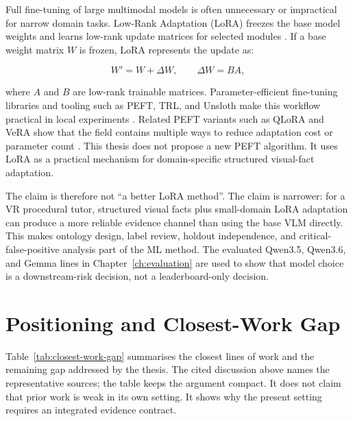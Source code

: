 Full fine-tuning of large multimodal models is often unnecessary or
impractical for narrow domain tasks. Low-Rank Adaptation (LoRA) freezes the
base model weights and learns low-rank update matrices for selected modules
\citep{hu2021lora}. If a base weight matrix \(W\) is frozen, LoRA represents
the update as:

\[
  W' = W + \Delta W,\qquad \Delta W = BA,
\]

where \(A\) and \(B\) are low-rank trainable matrices. Parameter-efficient
fine-tuning libraries and tooling such as PEFT, TRL, and Unsloth make this
workflow practical in local experiments
\citep{mangrulkar2022peft,vonwerra2020trl,unsloth2024}. Related PEFT variants
such as QLoRA and VeRA show that the field contains multiple ways to reduce
adaptation cost or parameter count \citep{dettmers2023qlora,kopiczko2023vera}.
This thesis does not propose a new PEFT algorithm. It uses LoRA as a practical
mechanism for domain-specific structured visual-fact adaptation.

The claim is therefore not ``a better LoRA method''. The claim is narrower:
for a VR procedural tutor, structured visual facts plus small-domain LoRA
adaptation can produce a more reliable evidence channel than using the base
VLM directly. This makes ontology design, label review, holdout independence,
and critical-false-positive analysis part of the ML method. The evaluated
Qwen3.5, Qwen3.6, and Gemma lines in Chapter~\ref{ch:evaluation} are used to
show that model choice is a downstream-risk decision, not a leaderboard-only
decision.

\section{Positioning and Closest-Work Gap}\label{sec:bg-positioning}

Table~\ref{tab:closest-work-gap} summarises the closest lines of work and the
remaining gap addressed by the thesis. The cited discussion above names the
representative sources; the table keeps the argument compact. It does not
claim that prior work is weak in its own setting. It shows why the present
setting requires an integrated evidence contract.

